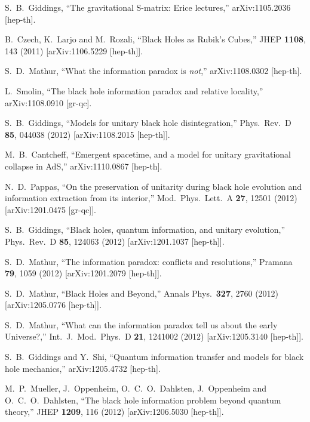 \documentclass[12pt]{article}
\begin{document}
\begin{thebibliography}{99}
  S.~B.~Giddings,
  ``The gravitational S-matrix: Erice lectures,''
  arXiv:1105.2036 [hep-th].

  B.~Czech, K.~Larjo and M.~Rozali,
  ``Black Holes as Rubik's Cubes,''
  JHEP {\bf 1108}, 143 (2011)
  [arXiv:1106.5229 [hep-th]].

  S.~D.~Mathur,
  ``What the information paradox is {\it not},''
  arXiv:1108.0302 [hep-th].

  L.~Smolin,
  ``The black hole information paradox and relative locality,''
  arXiv:1108.0910 [gr-qc].

  S.~B.~Giddings,
  ``Models for unitary black hole disintegration,''
  Phys.\ Rev.\ D {\bf 85}, 044038 (2012)
  [arXiv:1108.2015 [hep-th]].

  M.~B.~Cantcheff,
  ``Emergent spacetime, and a model for unitary gravitational collapse in AdS,''
  arXiv:1110.0867 [hep-th].

  N.~D.~Pappas,
  ``On the preservation of unitarity during black hole evolution and information extraction from its interior,''
  Mod.\ Phys.\ Lett.\ A {\bf 27}, 12501 (2012)
  [arXiv:1201.0475 [gr-qc]].

  S.~B.~Giddings,
  ``Black holes, quantum information, and unitary evolution,''
  Phys.\ Rev.\ D {\bf 85}, 124063 (2012)
  [arXiv:1201.1037 [hep-th]].

  S.~D.~Mathur,
  ``The information paradox: conflicts and resolutions,''
  Pramana {\bf 79}, 1059 (2012)
  [arXiv:1201.2079 [hep-th]].

  S.~D.~Mathur,
  ``Black Holes and Beyond,''
  Annals Phys.\  {\bf 327}, 2760 (2012)
  [arXiv:1205.0776 [hep-th]].

  S.~D.~Mathur,
  ``What can the information paradox tell us about the early Universe?,''
  Int.\ J.\ Mod.\ Phys.\ D {\bf 21}, 1241002 (2012)
  [arXiv:1205.3140 [hep-th]].

  S.~B.~Giddings and Y.~Shi,
  ``Quantum information transfer and models for black hole mechanics,''
  arXiv:1205.4732 [hep-th].

  M.~P.~Mueller, J.~Oppenheim, O.~C.~O.~Dahlsten, J.~Oppenheim and O.~C.~O.~Dahlsten,
  ``The black hole information problem beyond quantum theory,''
  JHEP {\bf 1209}, 116 (2012)
  [arXiv:1206.5030 [hep-th]].


\end{thebibliography}
\end{document}
